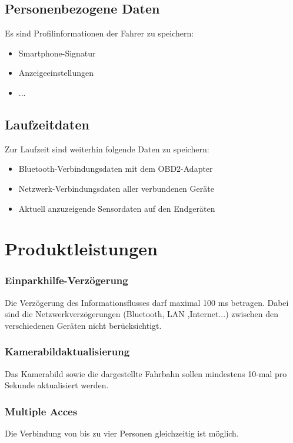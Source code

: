 \documentclass[pflichtenheft.tex]{subfiles}
\begin{document}
\section{\mkd Personenbezogene Daten}
Es sind Profilinformationen der Fahrer zu speichern:
\begin{itemize}
\item
Smartphone-Signatur
\item
Anzeigeeinstellungen
\item
...
\end{itemize}

\section{\mkd Laufzeitdaten}
Zur Laufzeit sind weiterhin folgende Daten zu speichern:
\begin{itemize}
\item
Bluetooth-Verbindungsdaten mit dem OBD2-Adapter
\item
Netzwerk-Verbindungsdaten aller verbundenen Geräte
\item
Aktuell anzuzeigende Sensordaten auf den Endgeräten


\end{itemize}



\chapter{Produktleistungen}

\subsection{\mkl Einparkhilfe-Verzögerung}
Die Verzögerung des Informationsflusses darf maximal 100 ms betragen. Dabei sind die Netzwerkverzögerungen (Bluetooth, LAN ,Internet...) zwischen den verschiedenen Geräten nicht berücksichtigt. 

\subsection{\mkl Kamerabildaktualisierung}
Das Kamerabild sowie die dargestellte Fahrbahn sollen mindestens 10-mal pro Sekunde aktualisiert werden.

\subsection{\mkl Multiple Acces} Die Verbindung von bis zu vier Personen gleichzeitig ist möglich.
\end{document}
